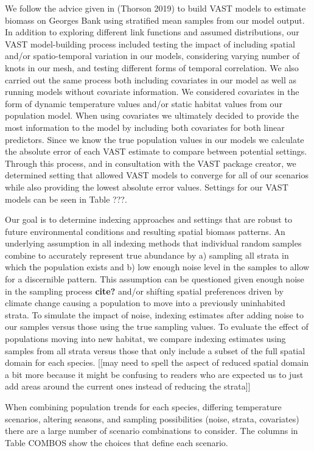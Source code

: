 \documentclass[
  12pt,
]{article}
\begin{document}
We follow the advice given in (Thorson 2019) to build VAST models to estimate biomass on Georges Bank using stratified mean samples from our model output. In addition to exploring different link functions and assumed distributions, our VAST model-building process included testing the impact of including spatial and/or spatio-temporal variation in our models, considering varying number of knots in our mesh, and testing different forms of temporal correlation. We also carried out the same process both including covariates in our model as well as running models without covariate information. We considered covariates in the form of dynamic temperature values and/or static habitat values from our population model. When using covariates we ultimately decided to provide the most information to the model by including both covariates for both linear predictors. Since we know the true population values in our models we calculate the absolute error of each VAST estimate to compare between potential settings. Through this process, and in consultation with the VAST package creator, we determined setting that allowed VAST models to converge for all of our scenarios while also providing the lowest absolute error values. Settings for our VAST models can be seen in Table ???.

Our goal is to determine indexing approaches and settings that are robust to future environmental conditions and resulting spatial biomass patterns. An underlying assumption in all indexing methods that individual random samples combine to accurately represent true abundance by a) sampling all strata in which the population exists and b) low enough noise level in the samples to allow for a discernible pattern. This assumption can be questioned given enough noise in the sampling process \textbf{cite?} and/or shifting spatial preferences driven by climate change causing a population to move into a previously uninhabited strata. To simulate the impact of noise, indexing estimates after adding noise to our samples versus those using the true sampling values. To evaluate the effect of populations moving into new habitat, we compare indexing estimates using samples from all strata versus those that only include a subset of the full spatial domain for each species. {[}{[}may need to spell the aspect of reduced spatial domain a bit more because it might be confusing to readers who are expected us to just add areas around the current ones instead of reducing the strata{]}{]}

When combining population trends for each species, differing temperature scenarios, altering seasons, and sampling possibilities (noise, strata, covariates) there are a large number of scenario combinations to consider. The columns in Table COMBOS show the choices that define each scenario.
\end{document}
